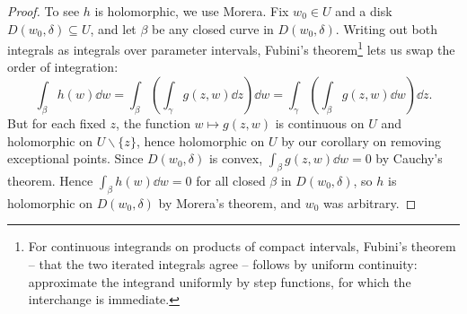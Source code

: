 \begin{proof}
    To see $h$ is holomorphic, we use Morera. Fix $w_0 \in U$ and a disk $D(w_0, \delta) \subseteq U$, and let $\beta$ be any closed curve in $D(w_0, \delta)$. Writing out both integrals as integrals over parameter intervals, Fubini's theorem\footnote{For continuous integrands on products of compact intervals, Fubini's theorem -- that the two iterated integrals agree -- follows by uniform continuity: approximate the integrand uniformly by step functions, for which the interchange is immediate.} lets us swap the order of integration:
    $$
    \int_\beta h(w) \dd w = \int_\beta \left(\int_\gamma g(z, w) \dd z \right) \dd w = \int_\gamma \left(\int_\beta g(z, w) \dd w\right) \dd z.
    $$
    But for each fixed $z$, the function $w \mapsto g(z, w)$ is continuous on $U$ and holomorphic on $U \backslash \{z\}$, hence holomorphic on $U$ by our corollary on removing exceptional points. Since $D(w_0, \delta)$ is convex, $\int_\beta g(z, w) \dd w = 0$ by Cauchy's theorem. Hence $\int_\beta h(w) \dd w = 0$ for all closed $\beta$ in $D(w_0, \delta)$, so $h$ is holomorphic on $D(w_0, \delta)$ by Morera's theorem, and $w_0$ was arbitrary.
\end{proof}

